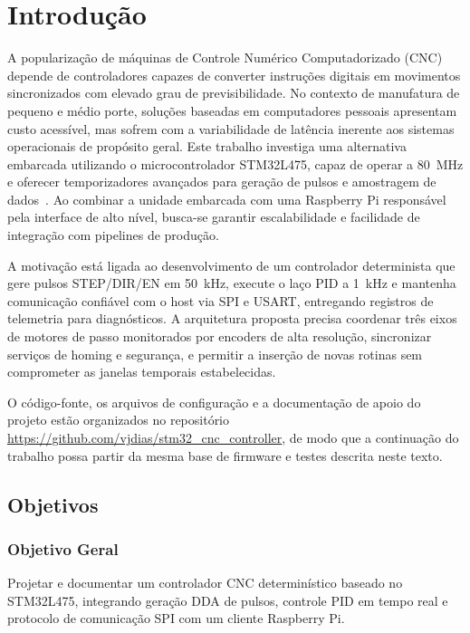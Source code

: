 \chapter{Introdução}\label{cap:introducao}

A popularização de máquinas de Controle Numérico Computadorizado (CNC)
depende de controladores capazes de converter instruções digitais em
movimentos sincronizados com elevado grau de previsibilidade. No
contexto de manufatura de pequeno e médio porte, soluções baseadas em
computadores pessoais apresentam custo acessível, mas sofrem com a
variabilidade de latência inerente aos sistemas operacionais de propósito
geral. Este trabalho investiga uma alternativa embarcada utilizando o
microcontrolador STM32L475, capaz de operar a \SI{80}{\mega\hertz} e
oferecer temporizadores avançados para geração de pulsos e amostragem de
dados~\cite{st_an4013}. Ao combinar a unidade embarcada com uma
Raspberry Pi responsável pela interface de alto nível, busca-se garantir
escalabilidade e facilidade de integração com pipelines de produção.

A motivação está ligada ao desenvolvimento de um controlador determinista
que gere pulsos STEP/DIR/EN em \SI{50}{\kilo\hertz}, execute o laço
PID a \SI{1}{\kilo\hertz} e mantenha comunicação confiável com o host
via SPI e USART, entregando registros de telemetria para diagnósticos. A
arquitetura proposta precisa coordenar três eixos de motores de passo
monitorados por encoders de alta resolução, sincronizar serviços de
homing e segurança, e permitir a inserção de novas rotinas sem
comprometer as janelas temporais estabelecidas.

O código-fonte, os arquivos de configuração e a documentação de apoio do
projeto estão organizados no repositório
\url{https://github.com/vjdias/stm32_cnc_controller}, de modo que a
continuação do trabalho possa partir da mesma base de firmware e testes
descrita neste texto.

\section{Objetivos}\label{sec:objetivos}

\subsection{Objetivo Geral}

Projetar e documentar um controlador CNC determinístico baseado no
STM32L475, integrando geração DDA de pulsos, controle PID em tempo real e
protocolo de comunicação SPI com um cliente Raspberry Pi.


